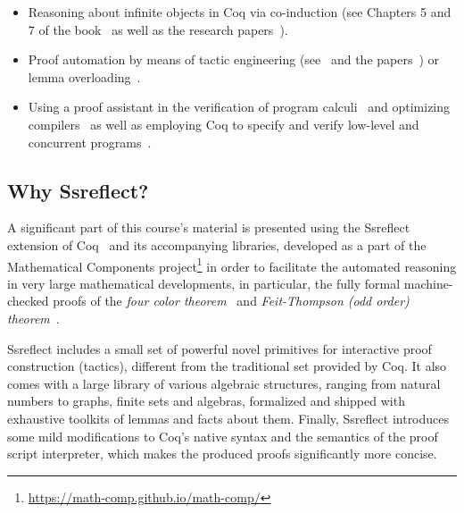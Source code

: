 \begin{itemize}
\item  Reasoning about infinite objects in Coq via co-induction (see Chapters 5 and 7 of the book~\cite{Chlipala:BOOK} as well as the research papers~\cite{Hur-al:POPL13,Leroy-Grall:IC09}).



\item  Proof automation by means of tactic engineering (see~\cite[Chapters 13--15]{Chlipala:BOOK} and the papers~\cite{Ziliani-al:ICFP13,Stampoulis-Shao:ICFP10,Stampoulis-Shao:POPL12}) or lemma overloading~\cite{Gontier-al:ICFP11}.



\item  Using a proof assistant in the verification of program calculi~\cite{Pierce-al:SF,Aydemir-al:POPL08} and optimizing compilers~\cite{Appel:BOOK14} as well as employing Coq to specify and verify low-level and concurrent programs~\cite{Nanevski-al:ESOP14,Chlipala:PLDI11,Feng-al:PLDI06,Cai-al:PLDI07}.

\end{itemize}


\subsection{Why Ssreflect?}






A significant part of this course's material is presented using the Ssreflect extension of Coq~\cite{Gontier-al:TR} and its accompanying libraries, developed as a part of the Mathematical Components project\footnote{\url{https://math-comp.github.io/math-comp/}} in order to facilitate the automated reasoning in very large mathematical developments, in particular, the fully formal machine-checked proofs of the \emph{four color theorem}~\cite{Gonthier:AMS08} and \emph{Feit-Thompson (odd order) theorem}~\cite{Gonthier-al:ITP13}.


  


Ssreflect includes a small set of powerful novel primitives for interactive proof construction (tactics), different from the traditional set provided by Coq. It also comes with a large library of various algebraic structures, ranging from natural numbers to graphs, finite sets and algebras, formalized and shipped with exhaustive toolkits of lemmas and facts about them. Finally, Ssreflect introduces some mild modifications to Coq's native syntax and the semantics of the proof script interpreter, which makes the produced proofs significantly more concise.


